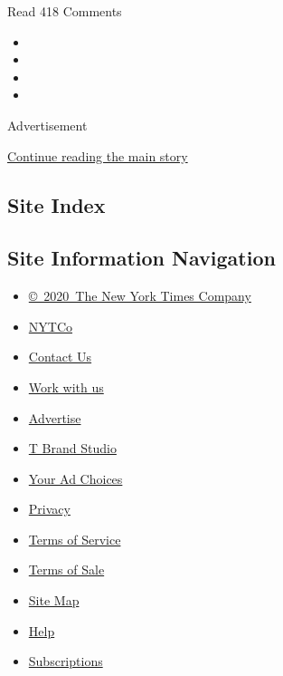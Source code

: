 Read 418 Comments

\begin{itemize}
\item
\item
\item
\item
\end{itemize}

Advertisement

\protect\hyperlink{after-bottom}{Continue reading the main story}

\hypertarget{site-index}{%
\subsection{Site Index}\label{site-index}}

\hypertarget{site-information-navigation}{%
\subsection{Site Information
Navigation}\label{site-information-navigation}}

\begin{itemize}
\tightlist
\item
  \href{https://help.nytimes.com/hc/en-us/articles/115014792127-Copyright-notice}{©~2020~The
  New York Times Company}
\end{itemize}

\begin{itemize}
\tightlist
\item
  \href{https://www.nytco.com/}{NYTCo}
\item
  \href{https://help.nytimes.com/hc/en-us/articles/115015385887-Contact-Us}{Contact
  Us}
\item
  \href{https://www.nytco.com/careers/}{Work with us}
\item
  \href{https://nytmediakit.com/}{Advertise}
\item
  \href{http://www.tbrandstudio.com/}{T Brand Studio}
\item
  \href{https://www.nytimes.com/privacy/cookie-policy\#how-do-i-manage-trackers}{Your
  Ad Choices}
\item
  \href{https://www.nytimes.com/privacy}{Privacy}
\item
  \href{https://help.nytimes.com/hc/en-us/articles/115014893428-Terms-of-service}{Terms
  of Service}
\item
  \href{https://help.nytimes.com/hc/en-us/articles/115014893968-Terms-of-sale}{Terms
  of Sale}
\item
  \href{https://spiderbites.nytimes.com}{Site Map}
\item
  \href{https://help.nytimes.com/hc/en-us}{Help}
\item
  \href{https://www.nytimes.com/subscription?campaignId=37WXW}{Subscriptions}
\end{itemize}
